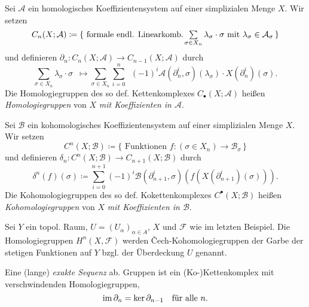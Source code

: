 \documentclass{cheat-sheet}
\newcommand{\nspace}[1]{\foreach \i in {1,...,#1}{ \! }} %
\begin{document}

\begin{defn}
  Sei $\mathcal{A}$ ein homologisches Koeffizientensystem auf einer simplizialen Menge $X$. Wir setzen
  \[ C_n(X; \mathcal{A}) \coloneqq \{ \text{ formale endl. Linearkomb. } \nspace{3} \sum_{\sigma \in X_n} \lambda_\sigma \cdot \sigma \text{ mit } \lambda_\sigma \in \mathcal{A}_\sigma \, \} \]
  und definieren $\partial_n : C_n(X; \mathcal{A}) \to C_{n-1}(X; \mathcal{A})$ durch
  \[ \sum_{\sigma \in X_n} \lambda_\sigma \cdot \sigma \enspace \mapsto \sum_{\sigma \in X_n} \sum_{i=0}^n \enspace (-1)^i \mathcal{A}(\partial_n^i, \sigma)(\lambda_\sigma) \cdot X(\partial_n^i)(\sigma). \]
  Die Homologiegruppen des so def. Kettenkomplexes $C_\bullet(X; \mathcal{A})$ heißen \emph{Homologiegruppen} von $X$ \emph{mit Koeffizienten in $\mathcal{A}$}.
\end{defn}

\begin{defn}
  Sei $\mathcal{B}$ ein kohomologisches Koeffizientensystem auf einer simplizialen Menge $X$. Wir setzen
  \[ C^n(X; \mathcal{B}) \coloneqq \{ \text{ Funktionen } f : (\sigma \in X_n) \to \mathcal{B}_\sigma \, \} \]
  und definieren $\delta_n : C^n(X; \mathcal{B}) \to C_{n+1}(X; \mathcal{B})$ durch
  \[ \delta^n(f)(\sigma) \coloneqq \sum_{i=0}^{n+1} (-1)^i \mathcal{B}(\partial_{n+1}^i, \sigma)(f(X(\partial_{n+1}^i)(\sigma))). \]
  Die Kohomologiegruppen des so def. Kokettenkomplexes $C^\bullet(X; \mathcal{B})$ heißen \emph{Kohomologiegruppen} von $X$ \emph{mit Koeffizienten in $\mathcal{B}$}.
\end{defn}


\begin{bsp}
  Sei $Y$ ein topol. Raum, $U = (U_\alpha)_{\alpha \in A}$, $X$ und $\mathcal{F}$ wie im letzten Beispiel. Die Homologiegruppen $H^n(X, \mathcal{F})$ werden Čech-Kohomologiegruppen der Garbe der stetigen Funktionen auf $Y$ bzgl. der Überdeckung $U$ genannt.
\end{bsp}




\begin{defn}
  Eine (lange) \emph{exakte Sequenz} ab. Gruppen ist ein (Ko-)Kettenkomplex mit verschwindenden Homologiegruppen, \dh{}
  \[ \operatorname{im} \partial_n = \ker \partial_{n-1} \quad \text{für alle $n$.} \]
\end{defn}
\end{document}
